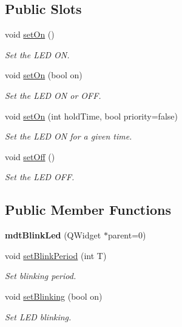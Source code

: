 \subsection*{Public Slots}
\begin{DoxyCompactItemize}
\item 
\hypertarget{classmdt_blink_led_ae51c54f31a11dbaebe69ab2c0b814d0f}{
void \hyperlink{classmdt_blink_led_ae51c54f31a11dbaebe69ab2c0b814d0f}{setOn} ()}
\label{classmdt_blink_led_ae51c54f31a11dbaebe69ab2c0b814d0f}

\begin{DoxyCompactList}\small\item\em Set the LED ON. \end{DoxyCompactList}\item 
void \hyperlink{classmdt_blink_led_aae5bb31d3d9a428717771cd926aa1d33}{setOn} (bool on)
\begin{DoxyCompactList}\small\item\em Set the LED ON or OFF. \end{DoxyCompactList}\item 
void \hyperlink{classmdt_blink_led_aab370ebe5c53203947e49e794d0959a7}{setOn} (int holdTime, bool priority=false)
\begin{DoxyCompactList}\small\item\em Set the LED ON for a given time. \end{DoxyCompactList}\item 
void \hyperlink{classmdt_blink_led_a951465e8a9ae5167e7eb05a7107ab13f}{setOff} ()
\begin{DoxyCompactList}\small\item\em Set the LED OFF. \end{DoxyCompactList}\end{DoxyCompactItemize}
\subsection*{Public Member Functions}
\begin{DoxyCompactItemize}
\item 
\hypertarget{classmdt_blink_led_abbc96bc408a45ceb191a908b2808a235}{
{\bfseries mdtBlinkLed} (QWidget $\ast$parent=0)}
\label{classmdt_blink_led_abbc96bc408a45ceb191a908b2808a235}

\item 
void \hyperlink{classmdt_blink_led_ae2dc395378aed0705ff19db5096a1efc}{setBlinkPeriod} (int T)
\begin{DoxyCompactList}\small\item\em Set blinking period. \end{DoxyCompactList}\item 
void \hyperlink{classmdt_blink_led_a1b15c8fafec0bc3aeb31ddf284ca7be2}{setBlinking} (bool on)
\begin{DoxyCompactList}\small\item\em Set LED blinking. \end{DoxyCompactList}\end{DoxyCompactItemize}


